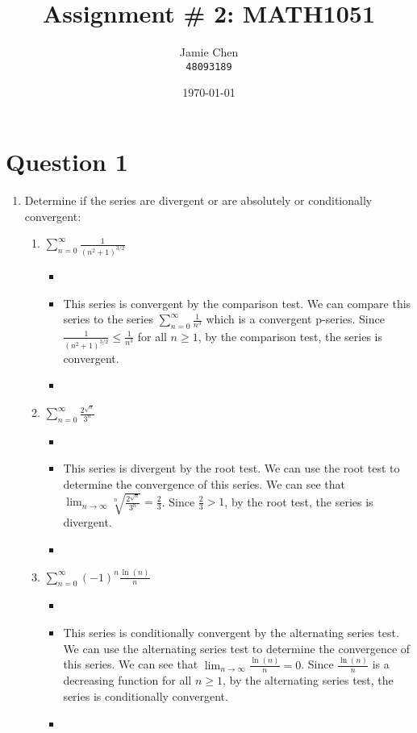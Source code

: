 \documentclass[12pt]{article}
\title{Assignment \# 2: MATH1051}
\author{Jamie Chen\\ \text{Student Number:} \texttt{48093189} \\ \text{Semester 2, 2023}}
\date{\today}
\begin{document}
\maketitle
\section*{Question 1}
\begin{enumerate}[leftmargin=\labelsep]
    \item Determine if the series are divergent or are absolutely or conditionally convergent:


    \begin{enumerate}
        \item $\displaystyle{\sum_{n=0}^{\infty} \frac{1}{({n^2+1})^{3/2}}}$
        \begin{itemize}[label={}]
            \item 
            \item This series is convergent by the comparison test. We can compare this series to the series $\displaystyle{\sum_{n=0}^{\infty} \frac{1}{n^3}}$ which is a convergent p-series. Since $\displaystyle{\frac{1}{({n^2+1})^{3/2}} \leq \frac{1}{n^3}}$ for all $n \geq 1$, by the comparison test, the series is convergent.
            \item 
        \end{itemize}


        \item $\displaystyle{\sum_{n=0}^{\infty} \frac{2^{\sqrt{n}}}{3^n}}$
        \begin{itemize}[label={}]
            \item
            \item This series is divergent by the root test. We can use the root test to determine the convergence of this series. We can see that $\displaystyle{\lim_{n \to \infty} \sqrt[n]{\frac{2^{\sqrt{n}}}{3^n}} = \frac{2}{3}}$. Since $\displaystyle{\frac{2}{3} > 1}$, by the root test, the series is divergent.
            \item 
        \end{itemize}


        \item $\displaystyle{\sum_{n=0}^{\infty} (-1)^n \frac{\ln (n)}{n}}$
        \begin{itemize}[label={}]
            \item 
            \item This series is conditionally convergent by the alternating series test. We can use the alternating series test to determine the convergence of this series. We can see that $\displaystyle{\lim_{n \to \infty} \frac{\ln (n)}{n} = 0}$. Since $\displaystyle{\frac{\ln (n)}{n}}$ is a decreasing function for all $n \geq 1$, by the alternating series test, the series is conditionally convergent.
            \item 
        \end{itemize}


\end{enumerate}
\end{enumerate}
\end{document}
